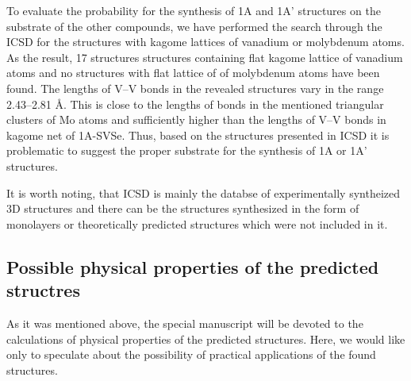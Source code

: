 \documentclass[a4paperm]{article}
\begin{document}
To evaluate the probability for the synthesis of 1A and 1A' structures on the substrate of the other compounds, we have performed the search through the ICSD for the structures with kagome lattices of vanadium or molybdenum atoms.
As the result, 17 structures structures containing flat kagome lattice of vanadium atoms and no structures with flat lattice of of molybdenum atoms have been found. 
The lengths of V--V bonds in the revealed structures vary in the range 2.43--2.81 \AA.
This is close to the lengths of bonds in the mentioned triangular clusters of Mo atoms and sufficiently higher than the lengths of V--V bonds in kagome net of 1A-SVSe.
Thus, based on the structures presented in ICSD it is problematic to suggest the proper substrate for the synthesis of 1A or 1A' structures.




It is worth noting, that ICSD is mainly the databse of experimentally syntheized 3D structures and there can be the structures synthesized in the form of monolayers or theoretically predicted structures which were not included in it.



\subsection{Possible physical properties of the predicted structres}

As it was mentioned above, the special manuscript will be devoted to the calculations of physical properties of the predicted structures.
Here, we would like only to speculate about the possibility of practical applications of the found structures.
\end{document}
